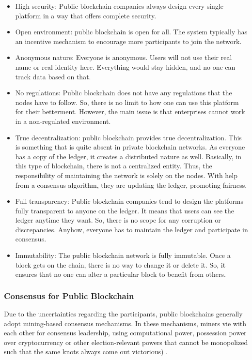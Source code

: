 \begin{itemize}
\item High security: Public blockchain companies always design every single platform in a way that offers complete security.
\item Open environment: public blockchain is open for all. The system typically has an incentive mechanism to encourage more participants to join the network.
\item Anonymous nature: Everyone is anonymous. Users will not use their real name or real identity here. Everything would stay hidden, and no one can track data based on that.
\item No regulations: Public blockchain does not have any regulations that the nodes have to follow. So, there is no limit to how one can use this platform for their betterment. However, the main issue is that enterprises cannot work in a non-regulated environment.
\item True decentralization: public blockchain provides true decentralization. This is something that is quite absent in private blockchain networks. As everyone has a copy of the ledger, it creates a distributed nature as well. Basically, in this type of blockchain, there is not a centralized entity. Thus, the responsibility of maintaining the network is solely on the nodes. With help from a consensus algorithm, they are updating the ledger, promoting fairness.
\item Full transparency: Public blockchain companies tend to design the platforms fully transparent to anyone on the ledger. It means that users can see the ledger anytime they want. So, there is no scope for any corruption or discrepancies. Anyhow, everyone has to maintain the ledger and participate in consensus.
\item Immutability: The public blockchain network is fully immutable. Once a block gets on the chain, there is no way to change it or delete it. So, it ensures that no one can alter a particular block to benefit from others.
\end{itemize}

\subsubsection{Consensus for Public Blockchain}\label{sec:consensoPublica}
Due to the uncertainties regarding the participants, public blockchains generally adopt mining-based consensus mechanisms. In these mechanisms, miners vie with each other for consensus leadership, using computational power, possession power over cryptocurrency or other election-relevant powers that cannot be monopolized such that the same knots always come out victorious) \cite{greve2018blockchain}.

